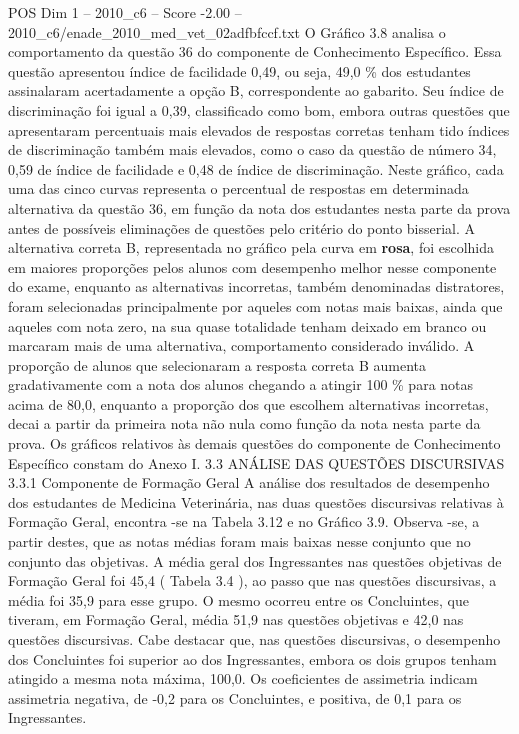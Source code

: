 \begin{textsample}{POS Dim 1 – 2010\_c6 – Score -2.00 – 2010\_c6/enade\_2010\_med\_vet\_02adfbfccf.txt}
O Gráfico 3.8 analisa o comportamento da questão 36 do componente de Conhecimento Específico.
Essa questão apresentou índice de facilidade 0,49, ou seja, 49,0 \% dos estudantes assinalaram acertadamente a opção B, correspondente ao gabarito.
Seu índice de discriminação foi igual a 0,39, classificado como bom, embora outras questões que apresentaram percentuais mais elevados de respostas corretas tenham tido índices de discriminação também mais elevados, como o caso da questão de número 34, 0,59 de índice de facilidade e 0,48 de índice de discriminação.
Neste gráfico, cada uma das cinco curvas representa o percentual de respostas em determinada alternativa da questão 36, em função da nota dos estudantes nesta parte da prova antes de possíveis eliminações de questões pelo critério do ponto bisserial.
A alternativa correta B, representada no gráfico pela curva em \textbf{rosa}, foi escolhida em maiores proporções pelos alunos com desempenho melhor nesse componente do exame, enquanto as alternativas incorretas, também denominadas distratores, foram selecionadas principalmente por aqueles com notas mais baixas, ainda que aqueles com nota zero, na sua quase totalidade tenham deixado em branco ou marcaram mais de uma alternativa, comportamento considerado inválido.
A proporção de alunos que selecionaram a resposta correta B aumenta gradativamente com a nota dos alunos chegando a atingir 100 \% para notas acima de 80,0, enquanto a proporção dos que escolhem alternativas incorretas, decai a partir da primeira nota não nula como função da nota nesta parte da prova.
Os gráficos relativos às demais questões do componente de Conhecimento Específico constam do Anexo I. 3.3 ANÁLISE DAS QUESTÕES DISCURSIVAS 3.3.1 Componente de Formação Geral A análise dos resultados de desempenho dos estudantes de Medicina Veterinária, nas duas questões discursivas relativas à Formação Geral, encontra -se na Tabela 3.12 e no Gráfico 3.9.
Observa -se, a partir destes, que as notas médias foram mais baixas nesse conjunto que no conjunto das objetivas.
A média geral dos Ingressantes nas questões objetivas de Formação Geral foi 45,4 ( Tabela 3.4 ), ao passo que nas questões discursivas, a média foi 35,9 para esse grupo.
O mesmo ocorreu entre os Concluintes, que tiveram, em Formação Geral, média 51,9 nas questões objetivas e 42,0 nas questões discursivas.
Cabe destacar que, nas questões discursivas, o desempenho dos Concluintes foi superior ao dos Ingressantes, embora os dois grupos tenham atingido a mesma nota máxima, 100,0.
Os coeficientes de assimetria indicam assimetria negativa, de -0,2 para os Concluintes, e positiva, de 0,1 para os Ingressantes.

\end{textsample}
